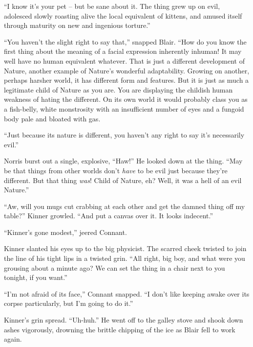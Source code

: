 \documentclass[letterpaper,openany,12pt]{memoir}		%
\begin{document}
``I know it's your pet -- but be sane about it. The thing grew up on evil,
adolesced slowly roasting alive the local equivalent of kittens, and amused
itself through maturity on new and ingenious torture.''

``You haven't the slight right to say that,'' snapped Blair. ``How do you know
the first thing about the meaning of a facial expression inherently inhuman! It
may well have no human equivalent whatever. That is just a different development
of Nature, another example of Nature's wonderful adaptability. Growing on
another, perhaps harsher world, it has different form and features. But it is
just as much a legitimate child of Nature as you are. You are displaying the
childish human weakness of hating the different. On its own world it would
probably class you as a fish-belly, white monstrosity with an insufficient
number of eyes and a fungoid body pale and bloated with gas.

``Just because its nature is different, you haven't any right to say it's
necessarily evil.''

Norris burst out a single, explosive, ``Haw!'' He looked down at the thing.
``May be that things from other worlds don't \emph{have} to be evil just because
they're different. But that thing \emph{was}! Child of Nature, eh? Well, it was
a hell of an evil Nature.''

``Aw, will you mugs cut crabbing at each other and get the damned thing off my
table?'' Kinner growled. ``And put a canvas over it. It looks indecent.''

``Kinner's gone modest,'' jeered Connant.

Kinner slanted his eyes up to the big physicist. The scarred cheek twisted to
join the line of his tight lips in a twisted grin. ``All right, big boy, and
what were you grousing about a minute ago? We can set the thing in a chair next
to you tonight, if you want.''

``I'm not afraid of its face,'' Connant snapped. ``I don't like keeping awake
over its corpse particularly, but I'm going to do it.''

Kinner's grin spread. ``Uh-huh.'' He went off to the galley stove and shook down
ashes vigorously, drowning the brittle chipping of the ice as Blair fell to work
again.


\chapter[Chapter 4]{}
\end{document}
